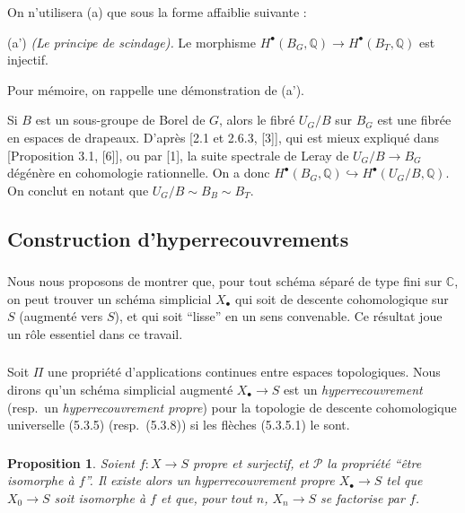 \documentclass[11pt]{amsart}
\theoremstyle{plain}
\newtheorem{proposition}[theorem]{Proposition}
\theoremstyle{definition}
\newcommand{\cP}{\mathcal{P}}
\newcommand{\CC}{\mathbb{C}}
\newcommand{\QQ}{\mathbb{Q}}
\begin{document}
On n'utilisera (a) que sous la forme affaiblie suivante :

(a') \emph{(Le principe de scindage).} Le morphisme $H^\bullet(B_G, \QQ) \to H^\bullet(B_T, \QQ)$ est injectif.

Pour m\'emoire, on rappelle une d\'emonstration de (a').

Si $B$ est un sous-groupe de Borel de $G$, alors le fibr\'e $U_G/B$ sur $B_G$ est une fibr\'ee en espaces de drapeaux. D'apr\`es [2.1 et 2.6.3, [3]], qui est mieux expliqu\'e dans [Proposition 3.1, [6]], ou par [1], la suite spectrale de Leray de $U_G/B \to B_G$ d\'eg\'en\`ere en cohomologie rationnelle. On a donc $H^\bullet(B_G, \QQ) \hookrightarrow H^\bullet(U_G/B, \QQ)$. On conclut en notant que $U_G/B \sim B_B \sim B_T$.

\subsection{Construction d'hyperrecouvrements}

\subsubsection{}
Nous nous proposons de montrer que, pour tout sch\'ema s\'epar\'e de type fini sur $\CC$, on peut trouver un sch\'ema simplicial $X_\bullet$ qui soit de descente cohomologique sur $S$ (augment\'e vers $S$), et qui soit ``lisse'' en un sens convenable. Ce r\'esultat joue un r\^ole essentiel dans ce travail.

\subsubsection{}
Soit $\Pi$ une propri\'et\'e d'applications continues entre espaces topologiques. Nous dirons qu'un sch\'ema simplicial augment\'e $X_\bullet \to S$ est un \emph{hyperrecouvrement} (resp.\ un \emph{hyperrecouvrement propre}) pour la topologie de descente cohomologique universelle (5.3.5) (resp.\ (5.3.8)) si les fl\`eches (5.3.5.1) le sont.

\subsubsection{}
\begin{proposition}
Soient $f : X \to S$ propre et surjectif, et $\cP$ la propri\'et\'e ``\^etre isomorphe \`a $f$''. Il existe alors un hyperrecouvrement propre $X_\bullet \to S$ tel que $X_0 \to S$ soit isomorphe \`a $f$ et que, pour tout $n$, $X_n \to S$ se factorise par $f$.
\end{proposition}
\end{document}
